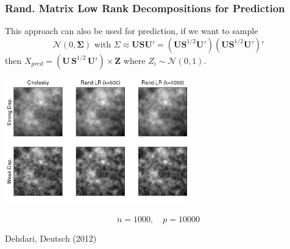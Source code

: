 \documentclass[t]{beamer}\usepackage[]{graphicx}\usepackage[]{color}
\begin{document}
\begin{frame}
\frametitle{Rand. Matrix Low Rank Decompositions for Prediction}

\vspace{-3mm}

This approach can also be used for prediction, if we want to sample 
\[ \mathcal{N}(0,\bm{\Sigma}) \text{ with }\Sigma \approx \bm{U} \bm{S} \bm{U}' = (\bm{U} \bm{S}^{1/2} \bm{U}')(\bm{U} \bm{S}^{1/2} \bm{U}')'\] 
then $X_{pred} = (\bm{U}\, \bm{S}^{1/2}\,\bm{U}') \times \bm{Z}$ where $Z_i \sim \mathcal{N}(0,1)$.

\pause

\begin{center}
\includegraphics[width=0.6\textwidth]{figs/RandLRPred.png}
\end{center}

\vspace{-10mm}

\[ n=1000, \quad p=10000 \]

\begin{center}
{\footnotesize
Dehdari, Deutsch (2012)
}
\end{center}

\end{frame}

\end{document}
